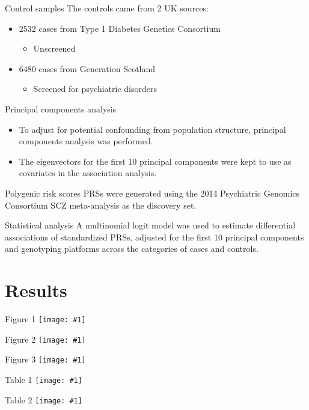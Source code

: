 \documentclass{beamer}
\newcommand*{\solo}[1]{\centering\texttt{[image: \#1]}}
\begin{document}
\begin{frame}{Control samples}
    The controls came from 2 UK sources:
    \begin{itemize}
        \item 2532 cases from Type 1 Diabetes Genetics Consortium
            \begin{itemize}
                \item Unscreened
            \end{itemize}
        \item 6480 cases from Generation Scotland
            \begin{itemize}
                \item Screened for psychiatric disorders
            \end{itemize}
    \end{itemize}
\end{frame}

\begin{frame}{Principal components analysis}
    \begin{itemize}
        \item To adjust for potential confounding from population structure, principal components analysis was performed.
        \item The eigenvectors for the first 10 principal components were kept to use as covariates in the association analysis.
    \end{itemize}
\end{frame}

\begin{frame}{Polygenic risk scores}
    PRSs were generated using the 2014 Psychiatric Genomics Consortium SCZ
    meta-analysis as the discovery set.
\end{frame}

\begin{frame}{Statistical analysis}
    A multinomial logit model was used to estimate differential associations of
    standardized PRSs, adjusted for the first 10 principal components and
    genotyping platforms across the categories of cases and controls.
\end{frame}

\section{Results}
\begin{frame}{Figure 1}
    \solo{F1.eps}
\end{frame}

\begin{frame}{Figure 2}
    \solo{F2.eps}
\end{frame}

\begin{frame}{Figure 3}
    \solo{F3.eps}
\end{frame}

\begin{frame}{Table 1}
    \solo{T1.eps}
\end{frame}

\begin{frame}{Table 2}
    \solo{T2.eps}
\end{frame}
\end{document}

